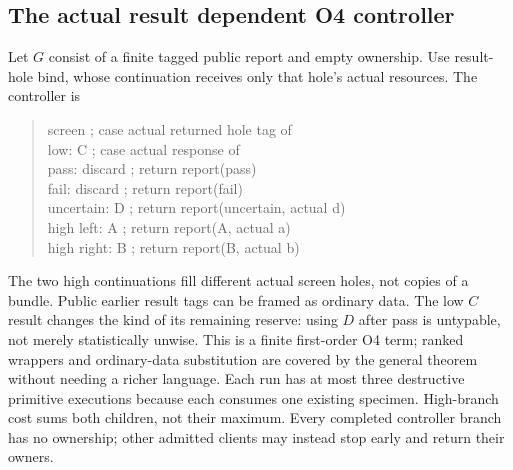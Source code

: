 \documentclass[11pt,a4paper]{article}
\theoremstyle{definition}
\begin{document}
\subsection{The actual result dependent O4 controller}
Let $G$ consist of a finite tagged public report and empty ownership.
Use result-hole bind, whose continuation receives only that hole's actual
resources. The controller is
\begin{quote}\ttfamily\small
screen ; case actual returned hole tag of\\
\hspace*{1em}low: C ; case actual response of\\
\hspace*{2em}pass: discard ; return report(pass)\\
\hspace*{2em}fail: discard ; return report(fail)\\
\hspace*{2em}uncertain: D ; return report(uncertain, actual d)\\
\hspace*{1em}high left: A ; return report(A, actual a)\\
\hspace*{1em}high right: B ; return report(B, actual b)
\end{quote}
The two high continuations fill different actual screen holes, not copies
of a bundle. Public earlier result tags can be framed as ordinary data.
The low $C$ result changes the kind of its remaining reserve: using $D$
after pass is untypable, not merely statistically unwise. This is a finite
first-order O4 term; ranked wrappers and ordinary-data substitution are
covered by the general theorem without needing a richer language.
Each run has at most three destructive primitive executions because each
consumes one existing specimen. High-branch cost sums both children,
not their maximum. Every completed controller branch has no ownership;
other admitted clients may instead stop early and return their owners.
\end{document}
